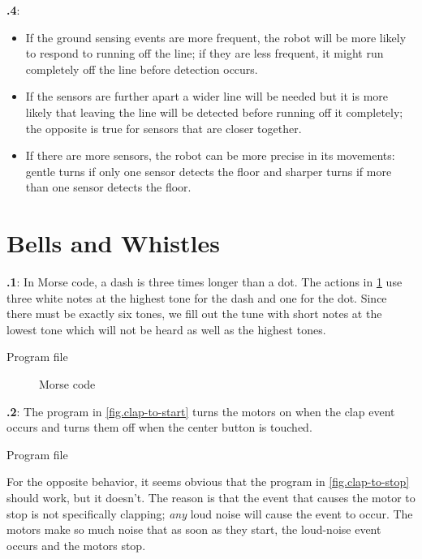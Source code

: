 \documentclass[12pt,a4paper,english]{article}
\begin{document}
\textbf{\thesection.4}:
\begin{itemize}
\item If the ground sensing events are more frequent, the robot will be
more likely to respond to running off the line; if they are less
frequent, it might run completely off the line before detection occurs.
\item If the sensors are further apart a wider line will be needed but
it is more likely that leaving the line will be detected before running
off it completely; the opposite is true for sensors that are closer
together.
\item If there are more sensors, the robot can be more precise in its
movements: gentle turns if only one sensor detects the floor and sharper
turns if more than one sensor detects the floor.
\end{itemize}

\section{Bells and Whistles}

\textbf{\thesection.1}:
In Morse code, a dash is three times longer than a dot. The actions in
\cref{fig.morse} use three white notes at the highest tone for the
dash and one for the dot. Since there must be exactly six tones, we fill
out the tune with short notes at the lowest tone which will not be heard
as well as the highest tones.

{\raggedleft \hfill Program file }

\begin{figure}
\begin{center}
\caption{Morse code}\label{fig.morse}
\end{center}
\end{figure}


\textbf{\thesection.2}: The program in \cref{fig.clap-to-start} turns the motors on when
the clap event occurs and turns them off when the center button is
touched.

{\raggedleft \hfill Program file }

For the opposite behavior, it seems obvious that the program in
\cref{fig.clap-to-stop} should work, but it doesn't. The reason is
that the event that causes the motor to stop is not specifically
clapping; \emph{any} loud noise will cause the event to occur. The
motors make so much noise that as soon as they start, the loud-noise
event occurs and the motors stop.
\end{document}
